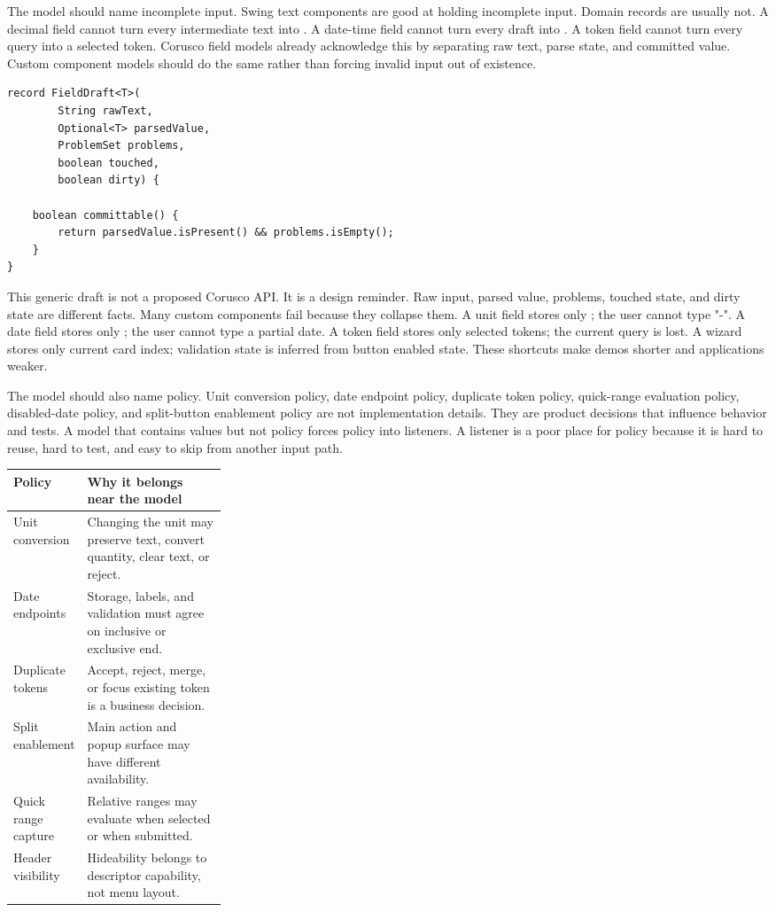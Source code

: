 The model should name incomplete input. Swing text components are good at
holding incomplete input. Domain records are usually not. A decimal field
cannot turn every intermediate text into . A date-time field
cannot turn every draft into . A token field cannot turn every
query into a selected token. Corusco field models already acknowledge this by
separating raw text, parse state, and committed value. Custom component
models should do the same rather than forcing invalid input out of existence.

\begin{lstlisting}[caption={A custom model should preserve incomplete input.}]
record FieldDraft<T>(
        String rawText,
        Optional<T> parsedValue,
        ProblemSet problems,
        boolean touched,
        boolean dirty) {

    boolean committable() {
        return parsedValue.isPresent() && problems.isEmpty();
    }
}
\end{lstlisting}

This generic draft is not a proposed Corusco API. It is a design reminder.
Raw input, parsed value, problems, touched state, and dirty state are
different facts. Many custom components fail because they collapse them. A
unit field stores only ; the user cannot type "-". A date
field stores only ; the user cannot type a partial date. A
token field stores only selected tokens; the current query is lost. A wizard
stores only current card index; validation state is inferred from button
enabled state. These shortcuts make demos shorter and applications weaker.

The model should also name policy. Unit conversion policy, date endpoint
policy, duplicate token policy, quick-range evaluation policy, disabled-date
policy, and split-button enablement policy are not implementation details.
They are product decisions that influence behavior and tests. A model that
contains values but not policy forces policy into listeners. A listener is a
poor place for policy because it is hard to reuse, hard to test, and easy to
skip from another input path.

\begin{tabularx}{0.96\linewidth}{@{}p{0.28\linewidth}X@{}}
\toprule
Policy & Why it belongs near the model\\
\midrule
Unit conversion & Changing the unit may preserve text, convert quantity, clear text, or reject.\\
Date endpoints & Storage, labels, and validation must agree on inclusive or exclusive end.\\
Duplicate tokens & Accept, reject, merge, or focus existing token is a business decision.\\
Split enablement & Main action and popup surface may have different availability.\\
Quick range capture & Relative ranges may evaluate when selected or when submitted.\\
Header visibility & Hideability belongs to descriptor capability, not menu layout.\\
\bottomrule
\end{tabularx}

